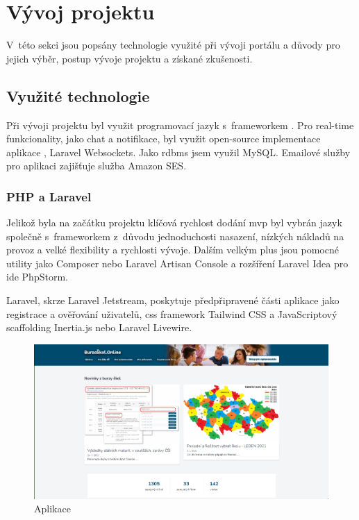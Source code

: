 \section{Vývoj projektu}

V~této sekci jsou popsány technologie využité při vývoji portálu \bso{} a důvody pro jejich výběr, postup vývoje projektu a získané zkušenosti.

\subsection{Využité technologie}
\label{sub:used-technologies}

Při vývoji projektu byl využit programovací jazyk  s~\gls{framework}em  . Pro \gls{real-time} funkcionality, jako chat a notifikace, byl využit \gls{open-source} implementace aplikace , Laravel Websockets\cite{laravel-websockets}. Jako \acrshort{rdbms} jsem využil MySQL\cite{mysql}. Emailové služby pro aplikaci zajišťuje služba Amazon SES\cite{amazon-ses}.

\subsubsection{PHP a Laravel}

Jelikož byla na začátku projektu \bso{} klíčová rychlost dodání \gls{mvp} byl vybrán jazyk  společně s~\gls{framework}em  z~důvodu jednoduchosti nasazení, nízkých nákladů na provoz a velké flexibility a rychlosti vývoje. Dalším velkým plus jsou pomocné utility jako Composer\cite{composer} nebo Laravel Artisan Console\cite{laravel-artisan} a rozšíření Laravel Idea\cite{laravel-idea} pro \acrshort{ide} PhpStorm\cite{phpstorm}.

Laravel, skrze Laravel Jetstream\cite{laravel-jetstream}, poskytuje předpřipravené části aplikace jako registrace a ověřování uživatelů, \acrshort{css} \gls{framework} Tailwind CSS\cite{tailwind-css} a JavaScriptový \gls{scaffolding} Inertia.js\cite{inertia-js} nebo Laravel Livewire\cite{laravel-livewire}.

\begin{figure}[h]
\centering
\includegraphics[width=\textwidth]{img/burzaskol-online.png}
\caption{Aplikace \bso{}}
\label{fig:burzaskol-online-2020}
\end{figure}


